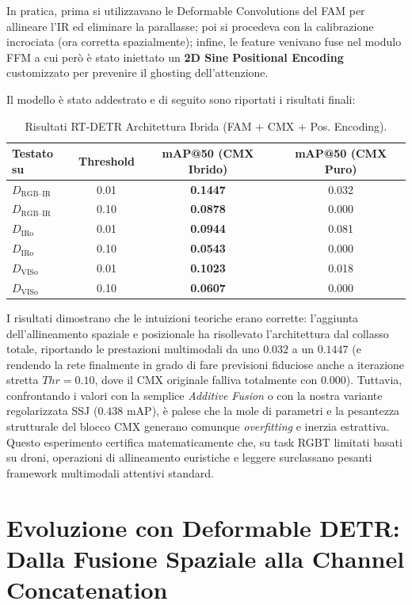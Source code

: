 \documentclass[a4paper,11pt]{article}
\begin{document}
In pratica, prima si utilizzavano le Deformable Convolutions del FAM per allineare l'IR ed eliminare la parallasse; poi si procedeva con la calibrazione incrociata (ora corretta spazialmente); infine, le feature venivano fuse nel modulo FFM a cui però è stato iniettato un \textbf{2D Sine Positional Encoding} customizzato per prevenire il ghosting dell'attenzione.

Il modello è stato addestrato e di seguito sono riportati i risultati finali:

\begin{table}[h]
\centering
\caption{Risultati RT-DETR Architettura Ibrida (FAM + CMX + Pos. Encoding).}
\label{tab:rtdetr_cmx_hybrid}
\begin{tabular}{lccc}
\toprule
Testato su & Threshold & mAP@50 (CMX Ibrido) & mAP@50 (CMX Puro) \\
\midrule
$D_{\text{RGB--IR}}$ & 0.01 & \textbf{0.1447} & 0.032 \\
$D_{\text{RGB--IR}}$ & 0.10 & \textbf{0.0878} & 0.000 \\
\midrule
$D_{\text{IRo}}$ & 0.01 & \textbf{0.0944} & 0.081 \\
$D_{\text{IRo}}$ & 0.10 & \textbf{0.0543} & 0.000 \\
\midrule
$D_{\text{VISo}}$ & 0.01 & \textbf{0.1023} & 0.018 \\
$D_{\text{VISo}}$ & 0.10 & \textbf{0.0607} & 0.000 \\
\bottomrule
\end{tabular}
\end{table}

I risultati dimostrano che le intuizioni teoriche erano corrette: l'aggiunta dell'allineamento spaziale e posizionale ha risollevato l'architettura dal collasso totale, riportando le prestazioni multimodali da uno $0.032$ a un $0.1447$ (e rendendo la rete finalmente in grado di fare previsioni fiduciose anche a iterazione stretta $Thr=0.10$, dove il CMX originale falliva totalmente con $0.000$). 
Tuttavia, confrontando i valori con la semplice \textit{Additive Fusion} o con la nostra variante regolarizzata SSJ ($0.438$ mAP), è palese che la mole di parametri e la pesantezza strutturale del blocco CMX generano comunque \textit{overfitting} e inerzia estrattiva. Questo esperimento certifica matematicamente che, su task RGBT limitati basati su droni, operazioni di allineamento euristiche e leggere surclassano pesanti framework multimodali attentivi standard.

\newpage

\section{Evoluzione con Deformable DETR: Dalla Fusione Spaziale alla Channel Concatenation}
\end{document}
